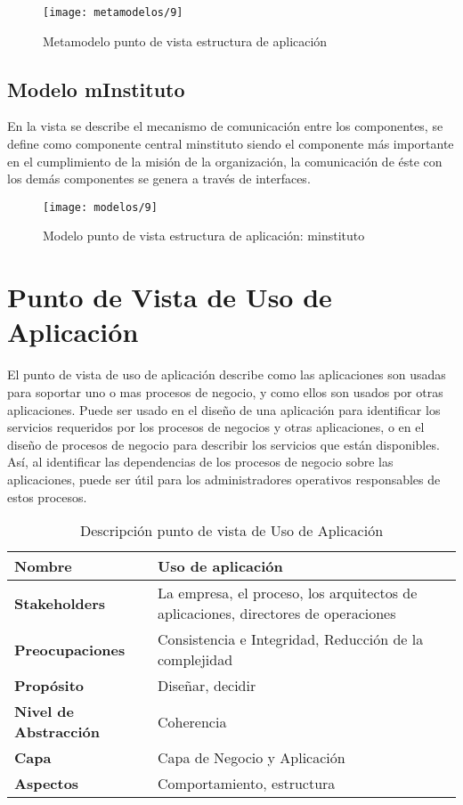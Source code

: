   \begin{figure}[H]
	\centering
	\texttt{[image: metamodelos/9]}
	\captionsetup{width=.95\textwidth}
	\caption{Metamodelo punto de vista estructura de aplicación}
	\label{metamodelo9}
  \end{figure}

  \subsection{Modelo mInstituto}
  En la vista se describe el mecanismo de comunicación entre los componentes, se define como componente central minstituto siendo el componente más importante en el cumplimiento de la misión de la organización, la comunicación de éste con los demás componentes se genera a través de interfaces.
  
  \begin{figure}[H]
	\centering
	\texttt{[image: modelos/9]}
	\captionsetup{width=.95\textwidth}
	\caption{Modelo punto de vista estructura de aplicación: minstituto}
	\label{modelo9}
  \end{figure}
  
  \section{Punto de Vista de Uso de Aplicación}
  El punto de vista de uso de aplicación describe como las aplicaciones son usadas para soportar uno o mas procesos de negocio, y como ellos son usados por otras aplicaciones. Puede ser usado en el diseño de una aplicación para identificar los servicios requeridos por los procesos de negocios y otras aplicaciones, o en el diseño de procesos de negocio para describir los servicios que están disponibles. Así, al identificar las dependencias de los procesos de negocio sobre las aplicaciones, puede ser útil para los administradores operativos responsables de estos procesos.
  
  \begin{table}[H]
  	\centering
  	\begin{tabular}{lp{8cm}}
  		\toprule
  		\textbf{Nombre} & \textbf{Uso de aplicación} \\
  		\midrule
  		\textbf{Stakeholders} & La empresa, el proceso, los arquitectos de aplicaciones, directores de operaciones \\
  		\textbf{Preocupaciones} & Consistencia e Integridad, Reducción de la complejidad \\
  		\textbf{Propósito} & Diseñar, decidir \\
  		\textbf{Nivel de Abstracción} & Coherencia \\
  		\textbf{Capa} & Capa de Negocio y Aplicación \\
  		\textbf{Aspectos} & Comportamiento, estructura \\
  		\bottomrule
  	\end{tabular}
  	\captionsetup{width=.95\textwidth}
  	\caption{Descripción punto de vista de Uso de Aplicación}
  	\label{tabla13}
  \end{table}
  
